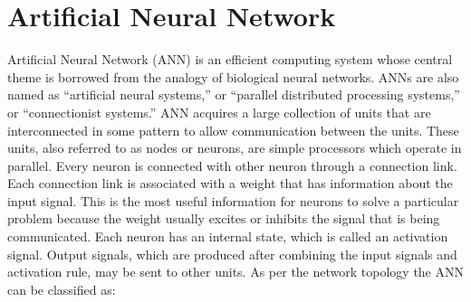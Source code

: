 \documentclass[a4paper, 12pt]{article}
\begin{document}
\section{Artificial Neural Network}
Artificial Neural Network (ANN) is an efficient computing system whose central theme is borrowed from the analogy of biological neural networks. ANNs are also named as “artificial neural systems,” or “parallel distributed processing systems,” or “connectionist systems.” ANN acquires a large collection of units that are interconnected in some pattern to allow communication between the units. These units, also referred to as nodes or neurons, are simple processors which operate in parallel. Every neuron is connected with other neuron through a connection link. Each connection link is associated with a weight that has information about the input signal. This is the most useful information for neurons to solve a particular problem because the weight usually excites or inhibits the signal that is being communicated. Each neuron has an internal state, which is called an activation signal. Output signals, which are produced after combining the input signals and activation rule, may be sent to other units. As per the network topology the ANN can be classified as:
\end{document}

